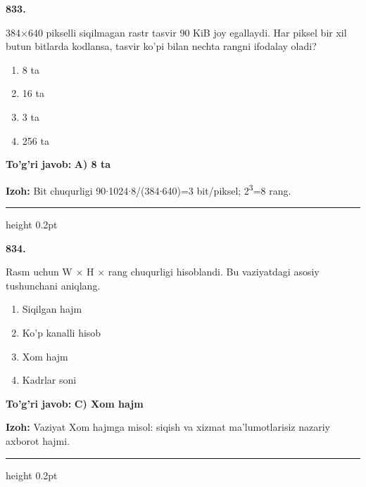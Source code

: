 \documentclass[10pt,a4paper,oneside]{article}
\begin{document}
\noindent\textbf{\color{ink}833.}
\par
384\ensuremath{\times}640 pikselli siqilmagan rastr tasvir 90 KiB joy egallaydi. Har piksel bir xil butun bitlarda kodlansa, tasvir ko'pi bilan nechta rangni ifodalay oladi?
\begin{enumerate}[label=\Alph*),leftmargin=9mm]
\item 8 ta
\item 16 ta
\item 3 ta
\item 256 ta
\end{enumerate}
\begin{tcolorbox}[enhanced,breakable,colback=teal!4,colframe=teal!50!black,boxrule=0.5pt,arc=1.1mm,left=3mm,right=3mm,top=1.7mm,bottom=1.7mm,before skip=2mm,after skip=2mm]
\textbf{\color{teal}To'g'ri javob:} \textbf{A) 8 ta}
\par\smallskip
\textbf{Izoh:} Bit chuqurligi 90\ensuremath{\cdot}1024\ensuremath{\cdot}8/(384\ensuremath{\cdot}640)=3 bit/piksel; 2\textsuperscript{3}=8 rang.
\end{tcolorbox}
\vspace{2mm}\hrule height 0.2pt \vspace{3mm}

\noindent\textbf{\color{ink}834.}
\par
Rasm uchun W \ensuremath{\times} H \ensuremath{\times} rang chuqurligi hisoblandi. Bu vaziyatdagi asosiy tushunchani aniqlang.
\begin{enumerate}[label=\Alph*),leftmargin=9mm]
\item Siqilgan hajm
\item Ko'p kanalli hisob
\item Xom hajm
\item Kadrlar soni
\end{enumerate}
\begin{tcolorbox}[enhanced,breakable,colback=teal!4,colframe=teal!50!black,boxrule=0.5pt,arc=1.1mm,left=3mm,right=3mm,top=1.7mm,bottom=1.7mm,before skip=2mm,after skip=2mm]
\textbf{\color{teal}To'g'ri javob:} \textbf{C) Xom hajm}
\par\smallskip
\textbf{Izoh:} Vaziyat Xom hajmga misol: siqish va xizmat ma'lumotlarisiz nazariy axborot hajmi.
\end{tcolorbox}
\vspace{2mm}\hrule height 0.2pt \vspace{3mm}
\end{document}
